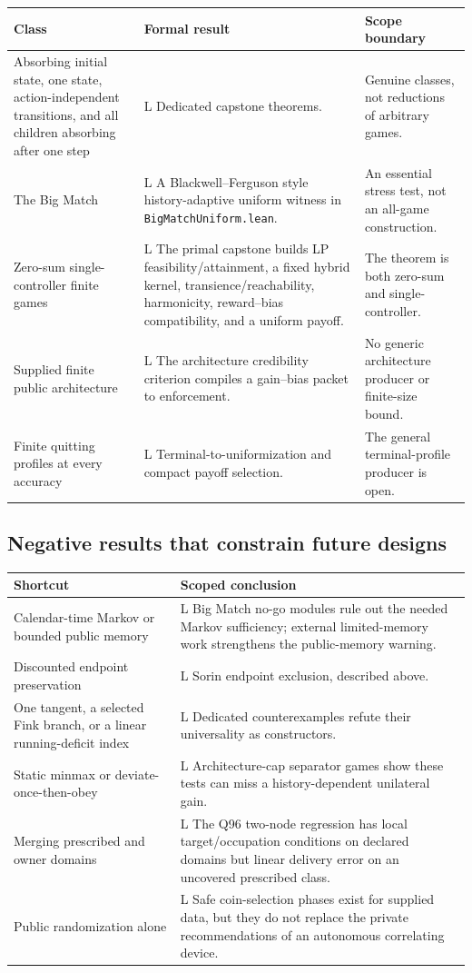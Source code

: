 \documentclass[11pt]{article}
\newcommand{\LTag}{\textsf{L}}
\newcommand{\Prod}{\LTag}
\newcommand{\Status}[1]{#1}
\begin{document}
\begin{longtable}{@{}p{}p{}p{}@{}}
\toprule
Class & Formal result & Scope boundary\\
\midrule
\endhead
Absorbing initial state, one state, action-independent transitions, and all
children absorbing after one step &
\Status{\Prod} Dedicated capstone theorems. &
Genuine classes, not reductions of arbitrary games.\\
The Big Match &
\Status{\Prod} A Blackwell--Ferguson style history-adaptive uniform witness
in \texttt{BigMatchUniform.lean}. &
An essential stress test, not an all-game construction.\\
Zero-sum single-controller finite games &
\Status{\Prod} The primal capstone builds LP feasibility/attainment, a fixed
hybrid kernel, transience/reachability, harmonicity, reward--bias
compatibility, and a uniform payoff. &
The theorem is both zero-sum and single-controller.\\
Supplied finite public architecture &
\Status{\Prod} The architecture credibility criterion compiles a gain--bias
packet to enforcement. &
No generic architecture producer or finite-size bound.\\
Finite quitting profiles at every accuracy &
\Status{\Prod} Terminal-to-uniformization and compact payoff selection. &
The general terminal-profile producer is open.\\
\bottomrule
\end{longtable}

\subsection{Negative results that constrain future designs}

\begin{longtable}{@{}p{}p{}@{}}
\toprule
Shortcut & Scoped conclusion\\
\midrule
\endhead
Calendar-time Markov or bounded public memory &
\Status{\Prod} Big Match no-go modules rule out the needed Markov
sufficiency; external limited-memory work strengthens the public-memory
warning.\\
Discounted endpoint preservation &
\Status{\Prod} Sorin endpoint exclusion, described above.\\
One tangent, a selected Fink branch, or a linear running-deficit index &
\Status{\Prod} Dedicated counterexamples refute their universality as
constructors.\\
Static minmax or deviate-once-then-obey &
\Status{\Prod} Architecture-cap separator games show these tests can miss a
history-dependent unilateral gain.\\
Merging prescribed and owner domains &
\Status{\Prod} The Q96 two-node regression has local target/occupation
conditions on declared domains but linear delivery error on an uncovered
prescribed class.\\
Public randomization alone &
\Status{\Prod} Safe coin-selection phases exist for supplied data, but they
do not replace the private recommendations of an autonomous correlating
device.\\
\bottomrule
\end{longtable}
\end{document}
